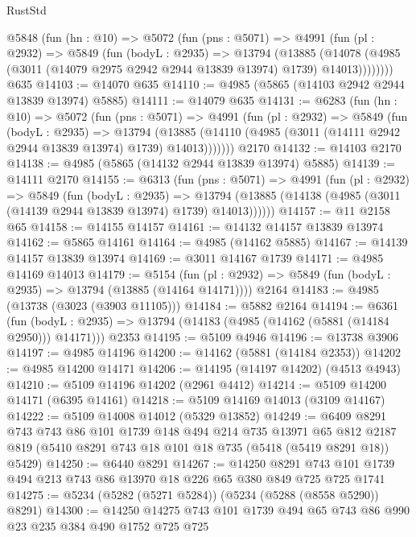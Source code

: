 \begin{lexlean}{RustStd}
\begin{coremodule}
    @5848
      (fun (hn : @10) =>
      @5072
        (fun (pns : @5071) =>
        @4991
          (fun (pl : @2932) =>
          @5849
            (fun (bodyL : @2935) =>
            @13794
              (@13885
                (@14078 (@4985 (@3011 (@14079 @2975 @2942 @2944 @13839 @13974) @1739) @14013))))))))
    @635
@14103 := @14070 @635
@14110 := @4985 (@5865 (@14103 @2942 @2944 @13839 @13974) @5885)
@14111 := @14079 @635
@14131 := @6283
    (fun (hn : @10) =>
    @5072
      (fun (pns : @5071) =>
      @4991
        (fun (pl : @2932) =>
        @5849
          (fun (bodyL : @2935) =>
          @13794
            (@13885 (@14110 (@4985 (@3011 (@14111 @2942 @2944 @13839 @13974) @1739) @14013)))))))
    @2170
@14132 := @14103 @2170
@14138 := @4985 (@5865 (@14132 @2944 @13839 @13974) @5885)
@14139 := @14111 @2170
@14155 := @6313
    (fun (pns : @5071) =>
    @4991
      (fun (pl : @2932) =>
      @5849
        (fun (bodyL : @2935) =>
        @13794 (@13885 (@14138 (@4985 (@3011 (@14139 @2944 @13839 @13974) @1739) @14013))))))
@14157 := @11 @2158 @65
@14158 := @14155 @14157
@14161 := @14132 @14157 @13839 @13974
@14162 := @5865 @14161
@14164 := @4985 (@14162 @5885)
@14167 := @14139 @14157 @13839 @13974
@14169 := @3011 @14167 @1739
@14171 := @4985 @14169 @14013
@14179 := @5154
    (fun (pl : @2932) => @5849 (fun (bodyL : @2935) => @13794 (@13885 (@14164 @14171))))
    @2164
@14183 := @4985 (@13738 (@3023 (@3903 @11105)))
@14184 := @5882 @2164
@14194 := @6361
    (fun (bodyL : @2935) => @13794 (@14183 (@4985 (@14162 (@5881 (@14184 @2950))) @14171)))
    @2353
@14195 := @5109 @4946
@14196 := @13738 @3906
@14197 := @4985 @14196
@14200 := @14162 (@5881 (@14184 @2353))
@14202 := @4985 @14200 @14171
@14206 := @14195 (@14197 @14202) (@4513 @4943)
@14210 := @5109 @14196 @14202 (@2961 @4412)
@14214 := @5109 @14200 @14171 (@6395 @14161)
@14218 := @5109 @14169 @14013 (@3109 @14167)
@14222 := @5109 @14008 @14012 (@5329 @13852)
@14249 := @6409
    @8291
    @743
    @743
    @86
    @101
    @1739
    @148
    @494
    @214
    @735
    @13971
    @65
    @812
    @2187
    @819
    (@5410 @8291 @743 @18 @101 @18 @735 (@5418 (@5419 @8291 @18)) @5429)
@14250 := @6440 @8291
@14267 := @14250
    @8291
    @743
    @101
    @1739
    @494
    @213
    @743
    @86
    @13970
    @18
    @226
    @65
    @380
    @849
    @725
    @725
    @1741
@14275 := @5234 (@5282 (@5271 @5284)) (@5234 (@5288 (@8558 @5290)) @8291)
@14300 := @14250
    @14275
    @743
    @101
    @1739
    @494
    @65
    @743
    @86
    @990
    @23
    @235
    @384
    @490
    @1752
    @725
    @725

\end{coremodule}
\end{lexlean}
